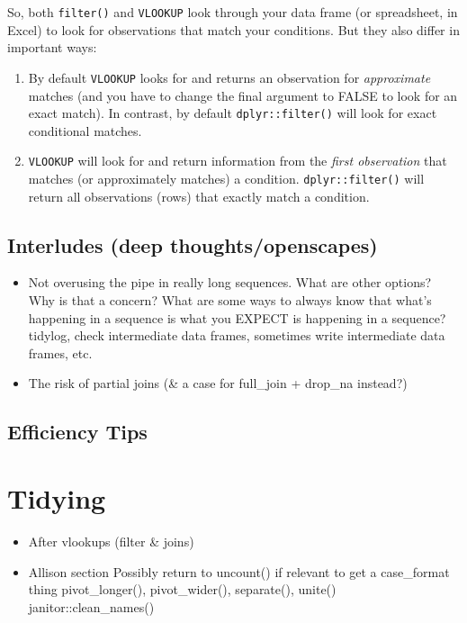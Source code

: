 \documentclass[]{book}
\providecommand{\tightlist}{%
  \setlength{\itemsep}{0pt}\setlength{\parskip}{0pt}}
\begin{document}
So, both \texttt{filter()} and \texttt{VLOOKUP} look through your data frame (or spreadsheet, in Excel) to look for observations that match your conditions. But they also differ in important ways:

\begin{enumerate}
\def\labelenumi{(\arabic{enumi})}
\item
  By default \texttt{VLOOKUP} looks for and returns an observation for \emph{approximate} matches (and you have to change the final argument to FALSE to look for an exact match). In contrast, by default \texttt{dplyr::filter()} will look for exact conditional matches.
\item
  \texttt{VLOOKUP} will look for and return information from the \emph{first observation} that matches (or approximately matches) a condition. \texttt{dplyr::filter()} will return all observations (rows) that exactly match a condition.
\end{enumerate}

\hypertarget{interludes-deep-thoughtsopenscapes-3}{%
\section{Interludes (deep thoughts/openscapes)}\label{interludes-deep-thoughtsopenscapes-3}}

\begin{itemize}
\item
  Not overusing the pipe in really long sequences. What are other options? Why is that a concern? What are some ways to always know that what's happening in a sequence is what you EXPECT is happening in a sequence? tidylog, check intermediate data frames, sometimes write intermediate data frames, etc.
\item
  The risk of partial joins (\& a case for full\_join + drop\_na instead?)
\end{itemize}

\hypertarget{efficiency-tips-4}{%
\section{Efficiency Tips}\label{efficiency-tips-4}}

\hypertarget{tidying}{%
\chapter{Tidying}\label{tidying}}

\begin{itemize}
\tightlist
\item
  After vlookups (filter \& joins)
\item
  Allison section
  Possibly return to uncount() if relevant to get a case\_format thing
  pivot\_longer(), pivot\_wider(), separate(), unite()
  janitor::clean\_names()
\end{itemize}
\end{document}
